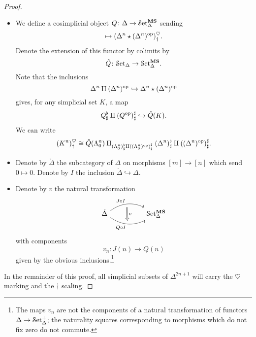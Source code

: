 \documentclass[main.tex]{subfiles}
\begin{document}
\begin{proof}
\begin{itemize}
    \item We define a cosimplicial object $Q\colon \Delta \to \mathcal{S}\mathrm{et}_{\Delta}^{\mathbf{MS}}$ sending
      \begin{equation*}
        [n] \mapsto (\Delta^{n} \star (\Delta^{n})\op)^{\heartsuit}_{\dagger}.
      \end{equation*}
      Denote the extension of this functor by colimits by
      \begin{equation*}
        \hat{Q}\colon \mathcal{S}\mathrm{et}_{\Delta} \to \mathcal{S}\mathrm{et}_{\Delta}^{\mathbf{MS}}.
      \end{equation*}
      Note that the inclusions
      \begin{equation*}
        \Delta^{n} \amalg (\Delta^{n})^{\mathrm{op}} \hookrightarrow \Delta^{n} \star (\Delta^{n})^{\mathrm{op}}
      \end{equation*}
      gives, for any simplicial set $K$, a map
      \begin{equation*}
        Q^{\flat}_{\sharp} \amalg (Q^{\mathrm{op}})^{\sharp}_{\sharp} \hookrightarrow \hat{Q}(K).
      \end{equation*}
      We can write
      \begin{equation*}
        (K^{n})^{\heartsuit}_{\dagger} \cong \hat{Q}(\Lambda^{n}_{0}) \amalg_{(\Lambda^{n}_{0})^{\flat}_{\sharp} \amalg ((\Lambda^{n}_{0})^{\mathrm{op}})^{\sharp}_{\sharp}} (\Delta^{n})^{\flat}_{\sharp} \amalg ((\Delta^{n})^{\mathrm{op}})^{\sharp}_{\sharp}.
      \end{equation*}

    \item Denote by $\mathring{\Delta}$ the subcategory of $\Delta$ on morphisms $[m] \to [n]$ which send $0 \mapsto 0$. Denote by $I$ the inclusion $\mathring{\Delta} \hookrightarrow \Delta$.

    \item Denote by $v$ the natural transformation
      \begin{equation*}
        \begin{tikzcd}[column sep=huge]
          \mathring{\Delta}
          \arrow[r, bend left, "J \circ I", ""{name=U, below}]
          \arrow[r, bend right, "Q \circ I"{swap}, ""{name=D, above}]
          & \SSetms
          \arrow[from=U, to=D, Rightarrow, "v"]
        \end{tikzcd}
      \end{equation*}
      with components
      \begin{equation*}
        v_{n}\colon J(n) \to Q(n)
      \end{equation*}
      given by the obvious inclusions.\footnote{The maps $v_{n}$ are not the components of a natural transformation of functors $\Delta \to \mathcal{S}\mathrm{et}_{\Delta}^{+}$; the naturality squares corresponding to morphisms which do not fix zero do not commute.}
  \end{itemize}
  In the remainder of this proof, all simplicial subsets of $\Delta^{2n+1}$ will carry the $\heartsuit$ marking and the $\dagger$ scaling. 



\end{proof}
\end{document}
